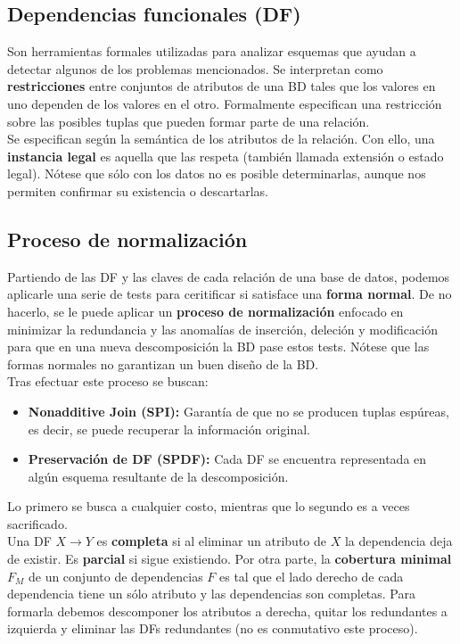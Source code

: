 \subsection*{Dependencias funcionales (DF)}
Son herramientas formales utilizadas para analizar esquemas que ayudan a detectar algunos de los problemas mencionados. Se interpretan como \textbf{restricciones} entre conjuntos de atributos de una BD tales que los valores en uno dependen de los valores en el otro. Formalmente especifican una restricción sobre las posibles tuplas que pueden formar parte de una relación. \\
Se especifican según la semántica de los atributos de la relación. Con ello, una \textbf{instancia legal} es aquella que las respeta (también llamada extensión o estado legal). Nótese que sólo con los datos no es posible determinarlas, aunque nos permiten confirmar su existencia o descartarlas.

\subsection*{Proceso de normalización}
Partiendo de las DF y las claves de cada relación de una base de datos, podemos aplicarle una serie de tests para ceritificar si satisface una \textbf{forma normal}. De no hacerlo, se le puede aplicar un \textbf{proceso de normalización} enfocado en minimizar la redundancia y las anomalías de inserción, deleción y modificación para que en una nueva descomposición la BD pase estos tests. Nótese que las formas normales no garantizan un buen diseño de la BD. \\
Tras efectuar este proceso se buscan:
\begin{itemize}
    \item \textbf{Nonadditive Join (SPI):} Garantía de que no se producen tuplas espúreas, es decir, se puede recuperar la información original.
    \item \textbf{Preservación de DF (SPDF):} Cada DF se encuentra representada en algún esquema resultante de la descomposición.
\end{itemize}
Lo primero se busca a cualquier costo, mientras que lo segundo es a veces sacrificado. \\
Una DF $X \rightarrow Y$ es \textbf{completa} si al eliminar un atributo de $X$ la dependencia deja de existir. Es \textbf{parcial} si sigue existiendo. Por otra parte, la \textbf{cobertura minimal} $F_M$ de un conjunto de dependencias $F$ es tal que el lado derecho de cada dependencia tiene un sólo atributo y las dependencias son completas. Para formarla debemos descomponer los atributos a derecha, quitar los redundantes a izquierda y eliminar las DFs redundantes (no es conmutativo este proceso).

